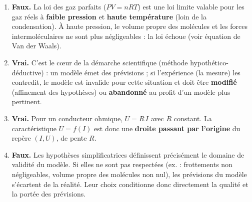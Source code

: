 \documentclass[11pt]{article}
\newcommand{\cle}[1]{{\popxbold\color{popdark}#1}}
\begin{document}
\begin{corrige}
\begin{enumerate}
\item \textbf{Faux.} La loi des gaz parfaits ($PV = nRT$) est une loi limite valable pour les gaz réels à \textbf{faible pression} et \textbf{haute température} (loin de la condensation). À haute pression, le volume propre des molécules et les forces intermoléculaires ne sont plus négligeables : la loi échoue (voir équation de Van der Waals).
\item \textbf{Vrai.} C'est le cœur de la démarche scientifique (méthode hypothético-déductive) : un modèle émet des prévisions ; si l'expérience (la mesure) les contredit, le modèle est invalide pour cette situation et doit être \textbf{modifié} (affinement des hypothèses) ou \textbf{abandonné} au profit d'un modèle plus pertinent.
\item \textbf{Vrai.} Pour un conducteur ohmique, $U = R\,I$ avec $R$ constant. La caractéristique $U = f(I)$ est donc une \textbf{droite passant par l'origine} du repère $(I, U)$, de pente $R$.
\item \textbf{Faux.} Les \cle{hypothèses simplificatrices} définissent précisément le domaine de validité du modèle. Si elles ne sont pas respectées (ex. : frottements non négligeables, volume propre des molécules non nul), les prévisions du modèle s'écartent de la réalité. Leur choix conditionne donc directement la qualité et la portée des prévisions.
\end{enumerate}
\end{corrige}
\end{document}

